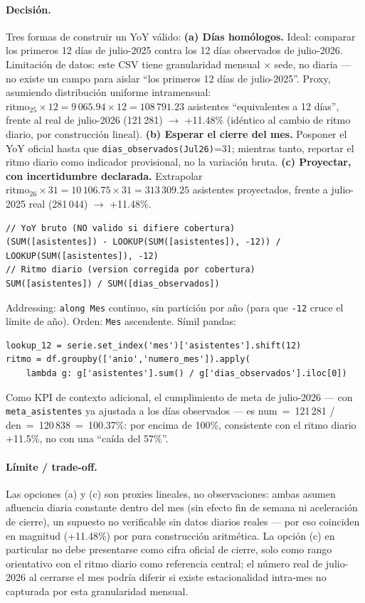 \paragraph{Decisión.}
Tres formas de construir un YoY válido:
\textbf{(a) Días homólogos.} Ideal: comparar los primeros 12 días de julio-2025 contra los 12 días observados de julio-2026. Limitación de datos: este CSV tiene granularidad mensual $\times$ sede, no diaria --- no existe un campo para aislar \enquote{los primeros 12 días de julio-2025}. Proxy, asumiendo distribución uniforme intramensual: $\text{ritmo}_{25}\times12 = 9\,065.94\times12 = 108\,791.23$ asistentes \enquote{equivalentes a 12 días}, frente al real de julio-2026 (121\,281) $\rightarrow$ +11.48\% (idéntico al cambio de ritmo diario, por construcción lineal).
\textbf{(b) Esperar el cierre del mes.} Posponer el YoY oficial hasta que \texttt{dias\_observados(Jul26)}=31; mientras tanto, reportar el ritmo diario como indicador provisional, no la variación bruta.
\textbf{(c) Proyectar, con incertidumbre declarada.} Extrapolar $\text{ritmo}_{26}\times31 = 10\,106.75\times31 = 313\,309.25$ asistentes proyectados, frente a julio-2025 real (281\,044) $\rightarrow$ +11.48\%.
\begin{lstlisting}[style=cod]
// YoY bruto (NO valido si difiere cobertura)
(SUM([asistentes]) - LOOKUP(SUM([asistentes]), -12)) / LOOKUP(SUM([asistentes]), -12)
// Ritmo diario (version corregida por cobertura)
SUM([asistentes]) / SUM([dias_observados])
\end{lstlisting}
Addressing: \texttt{along Mes} continuo, sin partición por año (para que \texttt{-12} cruce el límite de año). Orden: \texttt{Mes} ascendente. Símil pandas:
\begin{lstlisting}[style=cod]
lookup_12 = serie.set_index('mes')['asistentes'].shift(12)
ritmo = df.groupby(['anio','numero_mes']).apply(
    lambda g: g['asistentes'].sum() / g['dias_observados'].iloc[0])
\end{lstlisting}
Como KPI de contexto adicional, el cumplimiento de meta de julio-2026 --- con \texttt{meta\_asistentes} ya ajustada a los días observados --- es num~=~121\,281 / den~=~120\,838~=~100.37\%: por encima de 100\%, consistente con el ritmo diario +11.5\%, no con una \enquote{caída del 57\%}.

\paragraph{Límite / trade-off.}
Las opciones (a) y (c) son proxies lineales, no observaciones: ambas asumen afluencia diaria constante dentro del mes (sin efecto fin de semana ni aceleración de cierre), un supuesto no verificable sin datos diarios reales --- por eso coinciden en magnitud (+11.48\%) por pura construcción aritmética. La opción (c) en particular no debe presentarse como cifra oficial de cierre, solo como rango orientativo con el ritmo diario como referencia central; el número real de julio-2026 al cerrarse el mes podría diferir si existe estacionalidad intra-mes no capturada por esta granularidad mensual.

